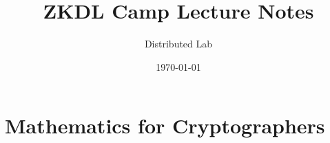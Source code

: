 \documentclass{zkdl-template}
\title{\huge\sffamily\bfseries ZKDL Camp Lecture Notes}
\author{\Large\sffamily Distributed Lab}
\date{\sffamily \today}
\begin{document}
\pagestyle{fancy}

\maketitle

\section{Mathematics for Cryptographers}


\end{document}

